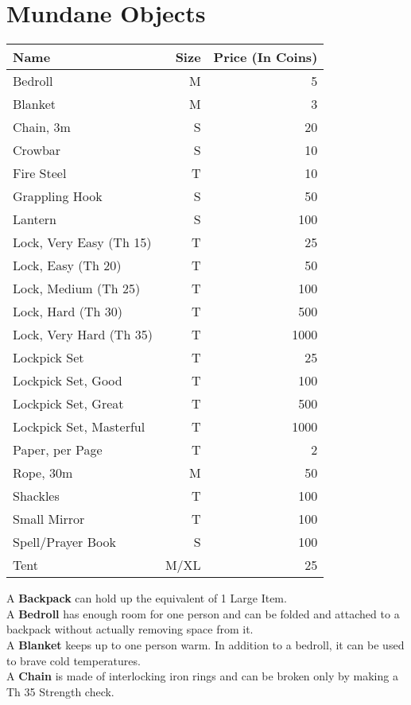 \section{Mundane Objects}\label{sec:mundaneObjects}
\begin{longtable}{l | r | r}
	Name & Size & Price (In Coins)\\ \hline
	Bedroll & M & 5\\
	Blanket & M & 3\\
	Chain, 3m & S & 20\\
	Crowbar & S & 10\\
	Fire Steel & T & 10\\
	Grappling Hook & S & 50\\
	Lantern & S & 100\\
	Lock, Very Easy (Th 15) & T & 25\\
	Lock, Easy (Th 20) & T & 50\\
	Lock, Medium (Th 25) & T & 100\\
	Lock, Hard (Th 30) & T & 500\\
	Lock, Very Hard (Th 35) & T & 1000\\
	Lockpick Set & T & 25\\
	Lockpick Set, Good & T & 100\\
	Lockpick Set, Great & T & 500\\
	Lockpick Set, Masterful & T & 1000\\
	Paper, per Page & T & 2\\
	Rope, 30m & M & 50\\
	Shackles & T & 100\\
	Small Mirror & T & 100\\
	Spell/Prayer Book & S & 100\\
	Tent & M/XL & 25\\
\end{longtable}

A \textbf{Backpack} can hold up the equivalent of 1 Large Item.\\

A \textbf{Bedroll} has enough room for one person and can be folded and attached to a backpack without actually removing space from it.\\

A \textbf{Blanket} keeps up to one person warm.
In addition to a bedroll, it can be used to brave cold temperatures.\\

A \textbf{Chain} is made of interlocking iron rings and can be broken only by making a Th 35 Strength check.\\

